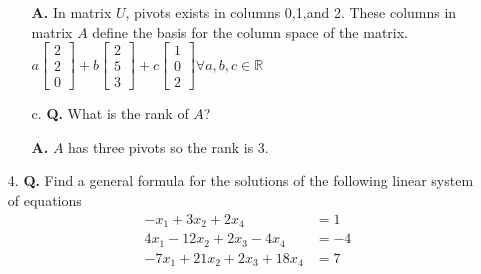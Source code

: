 \documentclass[main.tex]{subfiles}
\begin{document}
\begin{enumerate}
\begin{enumerate}
    \textbf{A.} In matrix $U$, pivots exists in columns 0,1,and 2. These columns in matrix $A$ define the basis for the column space of the matrix.
    $a\left[\begin{array}{l}2 \\ 2 \\ 0\end{array}\right] + b\left[\begin{array}{l}2 \\ 5 \\ 3\end{array}\right] + c\left[\begin{array}{l}1 \\ 0 \\ 2\end{array}\right] \forall a,b,c \in \mathbb{R}$
    
    
    \item [c.] \textbf{Q.} What is the rank of $A$?
    
    \textbf{A.} $A$ has three pivots so the rank is 3.
    
\end{enumerate}

\item[4.] \textbf{Q.} Find a general formula for the solutions of the following linear system of equations
$$
\begin{aligned}
-x_1 + 3x_2 + 2x_4 & = 1\\
4x_1 - 12x_2 + 2x_3 -4x_4 &= -4\\
-7x_1 +21x_2 + 2x_3 + 18x_4 &= 7
\end{aligned}
$$


\end{enumerate}
\end{document}
